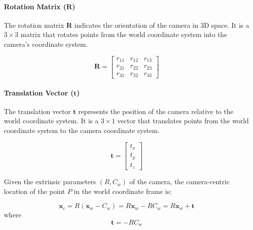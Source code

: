 \paragraph{Rotation Matrix ($\mathbf{R}$)}
The rotation matrix $\mathbf{R}$ indicates the orientation of the camera in 3D space. It is a $3 \times 3$ matrix that rotates points from the world coordinate system into the camera’s coordinate system.

\[
	\mathbf{R} =
	\begin{bmatrix}
		r_{11} & r_{12} & r_{13} \\
		r_{21} & r_{22} & r_{23} \\
		r_{31} & r_{32} & r_{33}
	\end{bmatrix}
\]

\paragraph{Translation Vector ($\mathbf{t}$)}
The translation vector $\mathbf{t}$ represents the position of the camera relative to the world coordinate system. It is a $3 \times 1$ vector that translates points from the world coordinate system to the camera coordinate system.

\[
	\mathbf{t} =
	\begin{bmatrix}
		t_x \\
		t_y \\
		t_z
	\end{bmatrix}
\]

Given the extrinsic parameters \( (R, C_w) \) of the camera, the camera-centric location of the point \( P \) in the world coordinate frame is:

\[
	\mathbf{x}_c = R (\mathbf{x}_w - C_w) = R \mathbf{x}_w - R C_w = R \mathbf{x}_w + \mathbf{t}
\]
where
\[
	\mathbf{t} = -R C_w
\]

